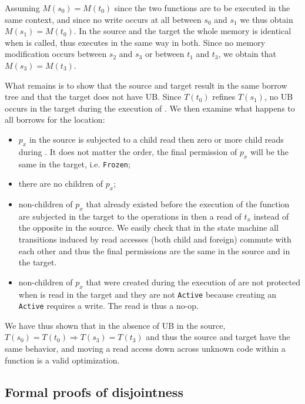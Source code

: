 \documentclass[a4paper,11pt]{article}
\theoremstyle{plain}
\theoremstyle{definition}
\theoremstyle{remark}
\newcommand{\tcode}[1]{\rstinline{#1}}
\newcommand{\tperm}[1]{\texttt{#1}}
\begin{document}
Assuming \(M(s_0) = M(t_0)\) since the two functions are to be executed in the
same context, and since no write occurs at all between \(s_0\) and \(s_1\)
we thus obtain \(M(s_1) = M(t_0)\). In the source and the target the whole memory
is identical when \tcode{g} is called, thus \tcode{g} executes in the same way
in both. Since no memory modification occurs between \(s_2\) and \(s_3\) or between
\(t_1\) and \(t_3\), we obtain that \(M(s_3) = M(t_3)\).

What remains is to show that the source and target result in the same
borrow tree and that the target does not have UB. Since \(T(t_0)\) refines
\(T(s_1)\), no UB occurs in the target during the execution of \tcode{g}.
We then examine what happens to all borrows for the location:
\begin{itemize}
    \item \(p_x\) in the source is subjected to a child read then zero or more
        child reads during \tcode{g}. It does not matter the order, the final
        permission of \(p_x\) will be the same in the target, i.e. \tperm{Frozen};
    \item there are no children of \(p_x\);
    \item non-children of \(p_x\) that already existed before the execution
        of the function are subjected in the target to the operations in \tcode{g}
        then a read of \(t_x\) instead of the opposite in the source. We easily
        check that in the state machine all transitions induced by read accesses
        (both child and foreign) commute with each other and thus the final
        permissions are the same in the source and in the target.
    \item non-children of \(p_x\) that were created during the execution of \tcode{g}
        are not protected when \tcode{*x} is read in the target and they are not
        \tperm{Active} because creating an \tperm{Active} requires a write.
        The read is thus a no-op.
\end{itemize}

We have thus shown that in the absence of UB in the source,
\(T(s_0) = T(t_0) \Longrightarrow T(s_3) = T(t_3)\) and
thus the source and target have the same behavior, and moving a read access
down across unknown code within a function is a valid optimization.

\subsection{Formal proofs of disjointness}
\end{document}
